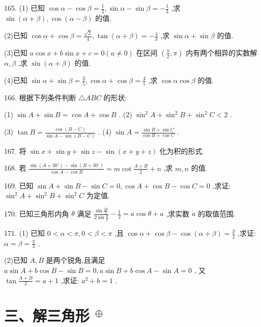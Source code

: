 \documentclass[10pt]{article}
\begin{document}
165. (1) 已知 \(\cos \alpha  - \cos \beta  = \frac{1}{2},\sin \alpha  - \sin \beta  =  - \frac{1}{3}\) ,求 \(\sin \left( {\alpha  + \beta }\right) ,\cos \left( {\alpha  - \beta }\right)\) 的值.

(2)已知 \(\cos \alpha  + \cos \beta  = \frac{\sqrt{2}}{4},\tan \left( {\alpha  + \beta }\right)  =  - \frac{4}{3}\) ,求 \(\sin \alpha  + \sin \beta\) 的值.

(3)已知 \(a\cos x + b\sin x + c = 0\left( {a \neq  0}\right)\) 在区间 \(\left( {\frac{\pi }{2},\pi }\right)\) 内有两个相异的实数解 \(\alpha ,\beta\) ,求 \(\sin \left( {\alpha  + \beta }\right)\) 的值.

(4)已知 \(\sin \alpha  + \sin \beta  = \frac{3}{5},\cos \alpha  + \cos \beta  = \frac{4}{5}\) ,求 \(\cos \alpha \cos \beta\) 的值.

166. 根据下列条件判断 \(\bigtriangleup {ABC}\) 的形状:

(1) \(\sin A + \sin B = \cos A + \cos B\) . (2) \({\sin }^{2}A + {\sin }^{2}B + {\sin }^{2}C < 2\) .

(3) \(\tan B = \frac{\cos \left( {B - C}\right) }{\sin A - \sin \left( {B - C}\right) }\) . (4) \(\sin A = \frac{\sin B + \sin C}{\cos B + \cos C}\) .

167. 将 \(\sin x + \sin y + \sin z - \sin \left( {x + y + z}\right)\) 化为积的形式.

168. 若 \(\frac{\sin \left( {A + {30}^{ \circ  }}\right)  - \sin \left( {B + {30}^{ \circ  }}\right) }{\cos A - \cos B} = m\cot \frac{A + B}{2} + n\) ,求 \(m,n\) 的值.

169. 已知 \(\sin A + \sin B - \sin C = 0,\cos A + \cos B - \cos C = 0\) ,求证: \({\sin }^{2}A + {\sin }^{2}B + {\sin }^{2}C\) 为定值.

170. 已知三角形内角 \(\theta\) 满足 \(\frac{\sin \frac{5\theta }{2}}{2\sin \frac{\theta }{2}} - \frac{1}{2} = a\cos \theta  + a\) ,求实数 \(a\) 的取值范围.

171. (1) 已知 \(0 < \alpha  < \pi ,0 < \beta  < \pi\) ,且 \(\cos \alpha  + \cos \beta  - \cos \left( {\alpha  + \beta }\right)  = \frac{3}{2}\) ,求证: \(\alpha  = \beta  = \frac{\pi }{3}\) .

(2)已知 \(A,B\) 是两个锐角,且满足 \(a\sin A + b\cos B - \sin B = 0,a\sin B + b\cos A - \sin A = 0\) , 又 \(\tan \frac{A + B}{2} = a + 1\) ,求证: \({a}^{2} + b = 1\) .

\section*{三、解三角形 \({}^{ \oplus  }\)}
\end{document}
